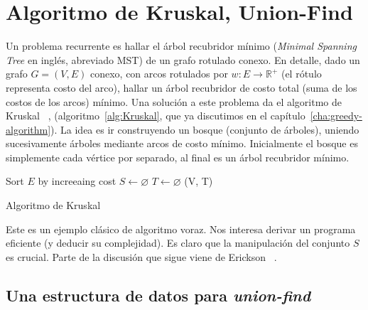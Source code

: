 

\chapter{Algoritmo de Kruskal, Union-Find}
\label{cha:algoritmo-de-kruskal}

  Un problema recurrente es hallar el árbol recubridor mínimo
  (\emph{\foreignlanguage{english}{Minimal Spanning Tree}} en inglés,
    abreviado MST)
  de un grafo rotulado conexo.
  En detalle,
  dado un grafo \(G = (V, E)\) conexo,
  con arcos rotulados por \(w \colon E \to \mathbb{R}^{+}\)
  (el rótulo representa costo del arco),
  hallar un árbol recubridor de costo total
  (suma de los costos de los arcos)
  mínimo.
  Una solución a este problema da el algoritmo de Kruskal~%
    \cite{kruskal56:_MST},
  (algoritmo~\ref{alg:Kruskal},
   que ya discutimos en el capítulo~\ref{cha:greedy-algorithm}).
  La idea es ir construyendo un bosque
  (conjunto de árboles),
  uniendo sucesivamente árboles
  mediante arcos de costo mínimo.
  Inicialmente el bosque es simplemente cada vértice por separado,
  al final es un árbol recubridor mínimo.
  \begin{algorithm}[ht]
    \DontPrintSemicolon\Indp

    Sort \(E\) by increeaing cost \;
    \(S \gets \varnothing\) \;
    \(T \gets \varnothing\) \;
    \Return (V, T) \;

    \caption{Algoritmo de Kruskal}
    \label{alg:Kruskal}
  \end{algorithm}
  Este es un ejemplo clásico de algoritmo voraz.
  Nos interesa derivar un programa eficiente
  (y deducir su complejidad).
  Es claro que la manipulación del conjunto \(S\)
  es crucial.
  Parte de la discusión que sigue viene de Erickson~%
    \cite[clase~17]{erickson19:_algorithms}.

\section{Una estructura de datos
       para \emph{\foreignlanguage{english}{union-find}}}
\label{sec:union-find-estructura}

